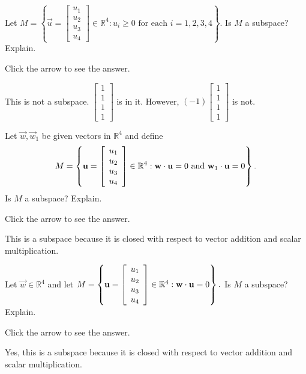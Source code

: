 \documentclass{ximera}
\begin{document}
\begin{problem}\label{prb:5.11} Let $M=\left\{ \vec{u}=\left[ \begin{array}{c}
u_{1} \\
u_{2} \\
u_{3} \\
u_{4}
\end{array}\right] \in
\mathbb{R}^{4}:u_{i}\geq 0\text{ for each }i=1,2,3,4\right\} .$ Is $M$ a
subspace? Explain.

Click the arrow to see the answer.  
\begin{expandable}
This is not a subspace. $\left[ \begin{array}{r}
1 \\
1 \\
1 \\
1
\end{array}
\right] $
is in it. However, $\left( -1\right) \left[
\begin{array}{r}
1 \\
1 \\
1 \\
1
\end{array}
\right] $ is not.
\end{expandable}
\end{problem}

\begin{problem}\label{prb:5.12} Let $\vec{w},\vec{w}_{1}$ be given vectors in $\mathbb{R}^{4}$ and define
\begin{equation*}
M=\left\{ \mathbf{u}=\left[ \begin{array}{c}
u_{1} \\
u_{2} \\
u_{3} \\
u_{4}
\end{array}\right] \in \mathbb{R}
^{4}:\mathbf{w}\cdot \mathbf{u}=0\text{ and }\mathbf{w}_{1}\cdot \mathbf{u}=0\right\}
.
\end{equation*}
Is $M$ a subspace? Explain.

Click the arrow to see the answer.  
\begin{expandable}
This is a subspace because it is closed
with respect to vector addition and scalar multiplication.
\end{expandable}
\end{problem}


\begin{problem}\label{prb:5.13} Let $\vec{w}\in \mathbb{R}^{4}$ and let $M=\left\{ \mathbf{u}
=\left[
\begin{array}{c}
u_{1} \\
u_{2} \\
u_{3} \\
u_{4}
\end{array}\right] \in \mathbb{R}^{4}:\mathbf{w}\cdot \mathbf{u}
=0\right\} .$ Is $M$ a subspace? Explain.

Click the arrow to see the answer.  
\begin{expandable}
Yes, this is a subspace because it is closed with respect to vector addition and scalar multiplication.
\end{expandable}
\end{problem}
\end{document}
